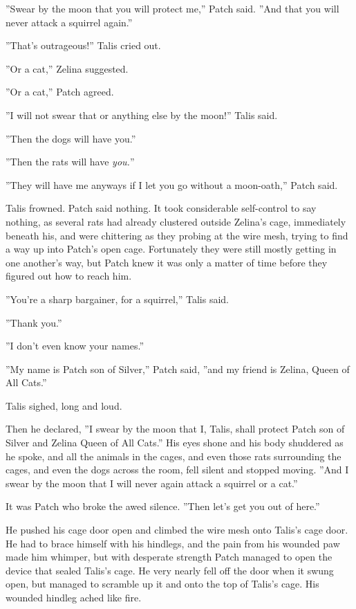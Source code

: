 \documentclass[12pt]{book}
\begin{document}
''Swear by the moon that you will protect me,'' Patch said. ''And that you will never attack a squirrel again.''

''That's outrageous!'' Talis cried out.

''Or a cat,'' Zelina suggested.

''Or a cat,'' Patch agreed.

''I will not swear that or anything else by the moon!'' Talis said.

''Then the dogs will have you.''

''Then the rats will have {\it you.}''

''They will have me anyways if I let you go without a moon-oath,'' Patch said.

Talis frowned. Patch said nothing. It took considerable self-control to say nothing, as several rats had already clustered outside Zelina's cage, immediately beneath his, and were chittering as they probing at the wire mesh, trying to find a way up into Patch's open cage. Fortunately they were still mostly getting in one another's way, but Patch knew it was only a matter of time before they figured out how to reach him.

''You're a sharp bargainer, for a squirrel,'' Talis said.

''Thank you.''

''I don't even know your names.''

''My name is Patch son of Silver,'' Patch said, ''and my friend is Zelina, Queen of All Cats.''

Talis sighed, long and loud.

Then he declared, ''I swear by the moon that I, Talis, shall protect Patch son of Silver and Zelina Queen of All Cats.'' His eyes shone and his body shuddered as he spoke, and all the animals in the cages, and even those rats surrounding the cages, and even the dogs across the room, fell silent and stopped moving. ''And I swear by the moon that I will never again attack a squirrel or a cat.''

It was Patch who broke the awed silence. ''Then let's get you out of here.''

He pushed his cage door open and climbed the wire mesh onto Talis's cage door. He had to brace himself with his hindlegs, and the pain from his wounded paw made him whimper, but with desperate strength Patch managed to open the device that sealed Talis's cage. He very nearly fell off the door when it swung open, but managed to scramble up it and onto the top of Talis's cage. His wounded hindleg ached like fire.
\end{document}
